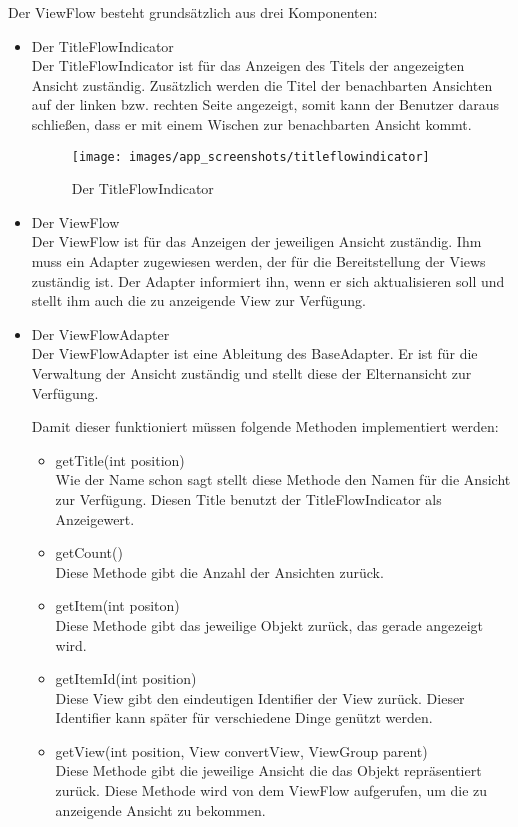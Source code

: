 Der ViewFlow besteht grundsätzlich aus drei Komponenten:
\begin{itemize}
\item{Der TitleFlowIndicator}\\
Der TitleFlowIndicator ist für das Anzeigen des Titels der angezeigten Ansicht zuständig. Zusätzlich werden die Titel der benachbarten Ansichten auf der linken bzw. rechten Seite angezeigt, somit kann der Benutzer daraus schließen, dass er mit einem Wischen zur benachbarten Ansicht kommt.\\ 
\begin{figure}[htbp]
\centering
    \texttt{[image: images/app\_screenshots/titleflowindicator]}
\caption{Der TitleFlowIndicator}
\end{figure}

\item{Der ViewFlow}\\
Der ViewFlow ist für das Anzeigen der jeweiligen Ansicht zuständig. Ihm muss ein Adapter zugewiesen  werden, der für die Bereitstellung der Views zuständig ist. Der Adapter informiert ihn, wenn er sich aktualisieren soll und stellt ihm auch die zu anzeigende View zur Verfügung.

\item{Der ViewFlowAdapter}\\
Der ViewFlowAdapter ist eine Ableitung des BaseAdapter. Er ist für die Verwaltung der Ansicht zuständig und stellt diese der Elternansicht zur Verfügung. 

Damit dieser funktioniert müssen folgende Methoden implementiert werden:
\begin{itemize}
\item{getTitle(int position)}\\
Wie der Name schon sagt stellt diese Methode den Namen für die Ansicht zur Verfügung. Diesen Title benutzt der TitleFlowIndicator als Anzeigewert.
\item{getCount()}\\
Diese Methode gibt die Anzahl der Ansichten zurück.
\item{getItem(int positon)}\\
Diese Methode gibt das jeweilige Objekt zurück, das gerade angezeigt wird. 
\item{getItemId(int position)}\\
Diese View gibt den eindeutigen Identifier der View zurück. Dieser Identifier kann später für verschiedene Dinge genützt werden.
\item{getView(int position, View convertView, ViewGroup parent)}\\
Diese Methode gibt die jeweilige Ansicht die das Objekt repräsentiert zurück. Diese Methode wird von dem ViewFlow aufgerufen, um die zu anzeigende Ansicht zu bekommen.
\end{itemize}
\end{itemize}

